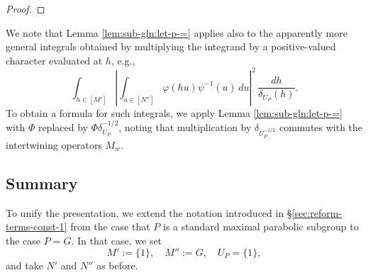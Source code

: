 \begin{proof}
\end{proof}

We note that Lemma \ref{lem:sub-gln:let-p-=} applies also to the apparently more general integrals obtained by multiplying the integrand by a positive-valued character evaluated at $h$, e.g.,
\begin{equation*}
  \int_{h \in [M']}
  \left\lvert \int_{u \in [N'']} \varphi(h u) \psi^{-1}(u) \,d u  \right\rvert^2
  \, \frac{d h}{\delta_{U_P}(h)}.
\end{equation*}
To obtain a formula for such integrals, we apply  Lemma \ref{lem:sub-gln:let-p-=} with $\Phi$ replaced by $\Phi \delta_{U_P}^{-1/2}$, noting that multiplication by $\delta_{U_P^{-1/2}}$ commutes with the intertwining operators $M_w$.


\subsection{Summary}\label{sec:summary-unification}
To unify the presentation, we extend the notation introduced in \S\ref{sec:reform-terms-const-1} from the case that $P$ is a standard maximal parabolic subgroup to the case $P = G$.  In that case, we set
\begin{equation*}
  M' := \{1\}, \quad M'' := G, \quad
  {U_P} = \{1\},
\end{equation*}
and take $N'$ and $N''$ as before.

